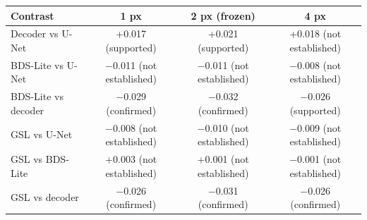 \begin{tabular}{lccc}
\toprule
Contrast & 1 px & 2 px (frozen) & 4 px \\
\midrule
Decoder vs U-Net & +0.017 (supported) & +0.021 (supported) & +0.018 (not established) \\
BDS-Lite vs U-Net & $-$0.011 (not established) & $-$0.011 (not established) & $-$0.008 (not established) \\
BDS-Lite vs decoder & $-$0.029 (confirmed) & $-$0.032 (confirmed) & $-$0.026 (supported) \\
GSL vs U-Net & $-$0.008 (not established) & $-$0.010 (not established) & $-$0.009 (not established) \\
GSL vs BDS-Lite & +0.003 (not established) & +0.001 (not established) & $-$0.001 (not established) \\
GSL vs decoder & $-$0.026 (confirmed) & $-$0.031 (confirmed) & $-$0.026 (confirmed) \\
\bottomrule
\end{tabular}
